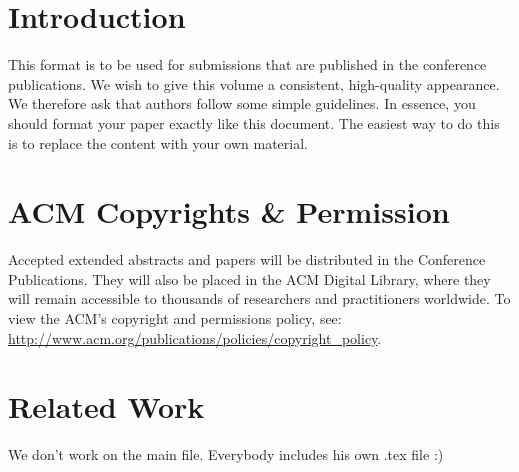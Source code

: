 \documentclass[sigchi-a, authorversion]{acmart}
\begin{document}


\section{Introduction}
This format is to be used for submissions that are published in the
conference publications. We wish to give this volume a consistent,
high-quality appearance. We therefore ask that authors follow some
simple guidelines. In essence, you should format your paper exactly
like this document. The easiest way to do this is to replace the
content with your own material.


\section{ACM Copyrights \& Permission}
Accepted extended abstracts and papers will be distributed in the
Conference Publications. They will also be placed in the ACM Digital
Library, where they will remain accessible to thousands of researchers
and practitioners worldwide. To view the ACM's copyright and
permissions policy, see:
\url{http://www.acm.org/publications/policies/copyright_policy}.


\section{Related Work}
We don't work on the main file. Everybody includes his own .tex file :)
 
 









\end{document}
